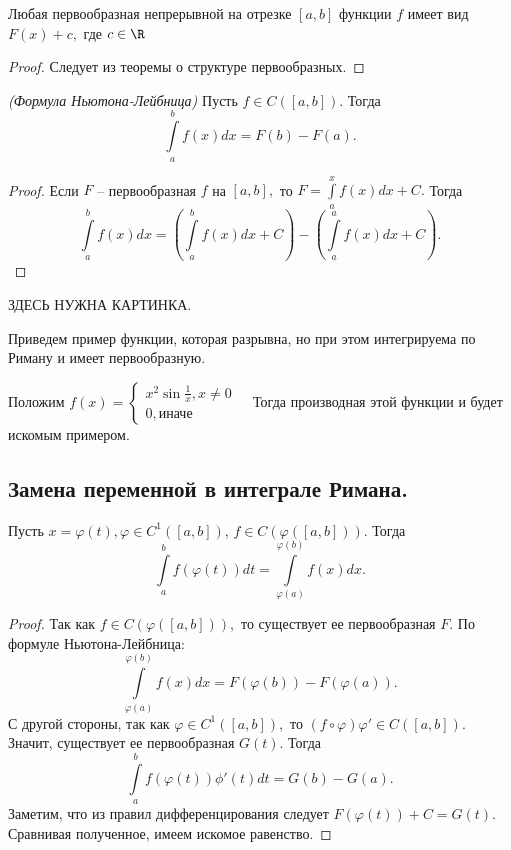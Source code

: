 \begin{corollary}
    Любая первообразная непрерывной на отрезке $[a, b]$ функции $f$ имеет вид $F(x) + c, $ где $c \in \R$
\end{corollary}

\begin{proof}
    Следует из теоремы о структуре первообразных.
\end{proof}

\begin{corollary}
    \textit{(Формула Ньютона-Лейбница)} Пусть $f \in C([a, b]).$ Тогда 
    $$\int \limits_a^b f(x) dx = F(b) - F(a).$$
\end{corollary}

\begin{proof}
    Если $F$ -- первообразная $f$ на $[a, b],$ то $F = \int \limits _a^x f(x) dx + C.$ Тогда
    $$\int \limits_a^b f(x) dx = \left(\int \limits_a^b f(x) dx + C \right) - \left(\int \limits_a^a f(x) dx + C\right).$$
\end{proof}

ЗДЕСЬ НУЖНА КАРТИНКА.

Приведем пример функции, которая разрывна, но при этом интегрируема по Риману и имеет первообразную.

\begin{example}
        \normalsize
        Положим $ f(x) =
        \begin{cases}
            x^2 \sin\frac{1}{x}, x \neq 0\\
            0, \text{иначе}&
        \end{cases}  
        $
    Тогда производная этой функции и будет искомым примером.
\end{example}

\subsection{Замена переменной в интеграле Римана.}

\begin{theorem}
    Пусть $x = \varphi(t), \varphi \in C^1([a, b])$, $f \in C(\varphi([a, b])).$ Тогда 
    $$\int \limits_a^b f(\varphi(t)) dt = \int \limits_{\varphi(a)}^{\varphi(b)} f(x) dx.$$
\end{theorem}

\begin{proof}
    Так как $f \in C(\varphi([a, b])),$ то существует ее первообразная $F.$ По формуле Ньютона-Лейбница:
    $$\int \limits_{\varphi(a)}^{\varphi(b)} f(x) dx = F(\varphi(b)) - F(\varphi(a)).$$
    С другой стороны, так как $\varphi \in C^1([a, b]),$ то $(f \circ \varphi) \varphi' \in C([a, b]).$ Значит, существует ее первообразная $G(t).$ Тогда
    $$\int \limits_a^b f(\varphi(t)) \phi'(t) dt = G(b) - G(a).$$
    Заметим, что из правил дифференцирования следует $F(\varphi(t)) + C = G(t).$ Сравнивая полученное, имеем искомое равенство.
\end{proof}


